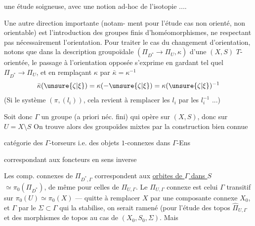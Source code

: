 
une étude soigneuse, avec une notion
ad-hoc de l'isotopie ....

Une autre direction importante (notam-
ment pour l'étude  cas non orienté,
non orientable) est l'introduction des
groupes finis d'homéomorphismes, ne
respectant pas nécessairement l'orientation.
Pour traiter le cas du changement d'orientation,
notons que dans la description groupoïdale
$(\Pi_{D^*}\longrightarrow\Pi_U,\kappa)$ d'une $(X,S)$ $T$-orientée,
le passage à l'orientation opposée s'exprime en
gardant tel quel $\Pi_{D^*}\longrightarrow\Pi_U$, et en
remplaçant $\kappa$ par $\bar\kappa=\kappa^{-1}$
\[
\bar\kappa(\unsure{\zeta|\xi})=\kappa(-\unsure{\zeta|\xi})=\kappa(\unsure{\zeta|\xi})^{-1}
\]
(Si  le système $(\pi,(l_i))$, cela revient à
remplacer les $l_i$ par les $l_i^{-1}$ ...)

Soit donc $\Gamma$ un groupe (a priori
 néc. fini) qui opère sur $(X,S)$, donc
sur $U=X\setminus S$  On trouve alors des
groupoïdes  mixtes  par la construction bien connue


catégorie des $\Gamma$-torseurs
i.e. des objets $1$-connexes
dans $\Gamma$-Ens

correspondant aux foncteurs en sens inverse


Les comp. connexes de $\Pi_{D^*,\Gamma}$ correspondent
aux \uline{orbites de $\Gamma$ dans $S$}  $\simeq\pi_0(\Pi_{D^*})$,
de même pour celles de $\Pi_{U,\Gamma}$. Le 
$\Pi_{U,\Gamma}$ connexe 
est celui  $\Gamma$ transitif
sur $\pi_0(U)\simeq\pi_0(X)$ --- quitte à remplacer
$X$ par une composante connexe $X_0$, et $\Gamma$
par le  $\Sigma\subset\Gamma$ qui la stabilise,
on serait ramené (pour l'étude des
topos $\widehat\Pi_{U,\Gamma}$ et des morphismes de topos
au cas de $(X_0,S_0,\Sigma)$. Mais 

